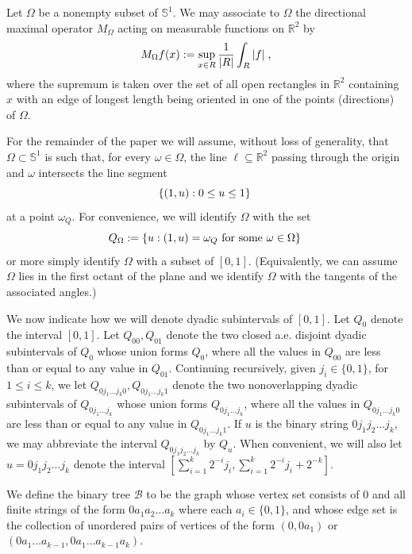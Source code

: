\documentclass[12pt]{amsart}
\numberwithin{equation}{section}
\theoremstyle{definition}
\theoremstyle{remark}
\begin{document}
Let $\Omega$ be a nonempty subset of $\mathbb{S}^{1}$.   We may associate to $\Omega$ the directional maximal operator $M_\Omega$ acting on measurable functions on $\mathbb{R}^2$ by
$$M_\Omega f(x) := \sup_{x \in R} \frac{1}{|R|} \int_R |f|\;\textup{,}$$
where the supremum is taken over the set of all open rectangles in $\mathbb{R}^2$ \mbox{containing $x$} with an edge of longest length being oriented in one of the points (directions) of $\Omega$.  

For the remainder of the paper we will assume, without loss of generality, that $\Omega \subset \mathbb{S}^{1}$ is such that, for every $\omega \in \Omega$, the line  $\ell \subseteq \mathbb{R}^2$  passing through the origin and $\omega$ intersects the line segment
$$\{(1, u) : 0 \leq u \leq 1\}\;\textup{}$$ at a point $\omega_Q$.   For convenience, we will  identify $\Omega$ with the set $$Q_\Omega := \{u  : (1, u) = \omega_Q \textup{ for some } \omega \in \Omega\}\;$$
or more simply identify $\Omega$ with a subset of $[0,1]$.  (Equivalently, we can assume $\Omega$ lies in the first octant of the plane and we identify $\Omega$ with the tangents of the associated angles.)

We now indicate how we will denote dyadic subintervals of $[0,1]$.  Let $Q_0$ denote the interval $[0,1]$.   Let $Q_{00}, Q_{01}$ denote the two  closed a.e. disjoint dyadic subintervals of $Q_0$ whose union forms $Q_0$, where all the values in $Q_{00}$ are less than or equal to any value in $Q_{01}$.   Continuing recursively, given $  j_i \in \{0,1\} $, for $1 \leq i \leq k$, we let  $Q_{0j_1 \ldots j_k 0}, Q_{0 j_1 \ldots j_k 1}$ denote the two nonoverlapping dyadic subintervals of $Q_{0 j_1 \ldots j_k}$ whose union forms $Q_{0j_1\ldots j_k}$, where all the values in  $Q_{0 j_1\ldots j_k 0}$ are less than or equal to any value in   $Q_{0 j_1\ldots j_k 1}$.   If $u$ is the binary string  $0j_1j_2\ldots j_k$, we may abbreviate the interval $Q_{0j_1j_2\ldots j_k}$ by $Q_u$.  When convenient, we will also let $u = 0j_1j_2\ldots j_k$ denote the interval $[\sum_{i=1}^k 2^{-i}j_i, \sum_{i=1}^k 2^{-i}j_i + 2^{-k}].$ %

We define the binary tree $\mathscr{B}$ to be the graph whose vertex set consists of $0$ and all finite strings of the form $0 a_1 a_2 \ldots a_k$ where each $a_i \in \{0, 1\}$, and whose edge set is the collection of unordered pairs of  vertices of the form $(0, 0 a_1)$ or $(0 a_1 \ldots a_{k-1} , 0 a_1 \ldots a_{k-1} a_k)$.
\end{document}
